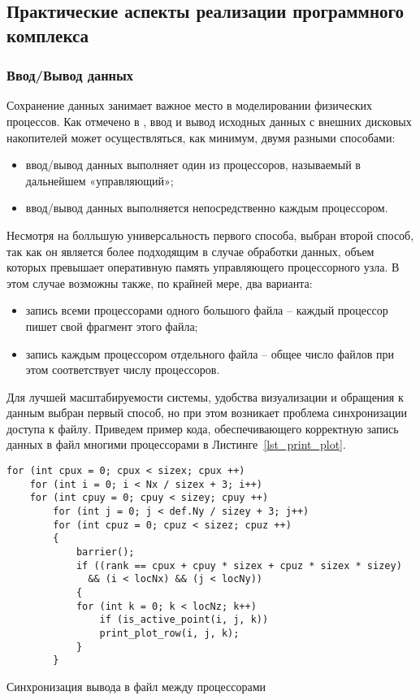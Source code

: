 \subsection{Практические аспекты реализации программного комплекса}

\subsubsection*{Ввод/Вывод данных}
Сохранение данных занимает важное место в моделировании
физических процессов. Как отмечено в \cite{Yakobovsky},
ввод и вывод исходных данных с внешних дисковых накопителей может осуществляться, как минимум,
двумя разными способами:
\begin{itemize}
\item ввод/вывод данных выполняет один из процессоров, называемый в
дальнейшем «управляющий»;
\item ввод/вывод данных выполняется непосредственно каждым процессором.
\end{itemize}
Несмотря на болльшую универсальность первого способа,
выбран второй способ, так как он является более подходящим
в случае обработки данных, объем которых превышает оперативную память управляющего
процессорного узла.
В этом случае возможны также, по крайней мере, два варианта:
\begin{itemize}
\item запись всеми процессорами одного большого файла -- каждый процессор
пишет свой фрагмент этого файла;
\item запись каждым процессором отдельного файла -- общее число файлов
при этом соответствует числу процессоров.
\end{itemize}
Для лучшей масштабируемости системы, удобства визуализации и обращения
к данным выбран первый способ,
но при этом возникает проблема синхронизации доступа к файлу.
Приведем пример кода, обеспечивающего корректную запись данных в файл
многими процессорами в Листинге~\ref{lst_print_plot}.
\begin{listing}
\begin{verbatim}
for (int cpux = 0; cpux < sizex; cpux ++)
    for (int i = 0; i < Nx / sizex + 3; i++)
	for (int cpuy = 0; cpuy < sizey; cpuy ++)
	    for (int j = 0; j < def.Ny / sizey + 3; j++)
		for (int cpuz = 0; cpuz < sizez; cpuz ++)
		{
		    barrier();
		    if ((rank == cpux + cpuy * sizex + cpuz * sizex * sizey)
			  && (i < locNx) && (j < locNy))
		    {
			for (int k = 0; k < locNz; k++)
			    if (is_active_point(i, j, k))
				print_plot_row(i, j, k);
		    }
		}
\end{verbatim}
\caption{Синхронизация вывода в файл между процессорами}
\label{lst_print_plot}
\end{listing}


